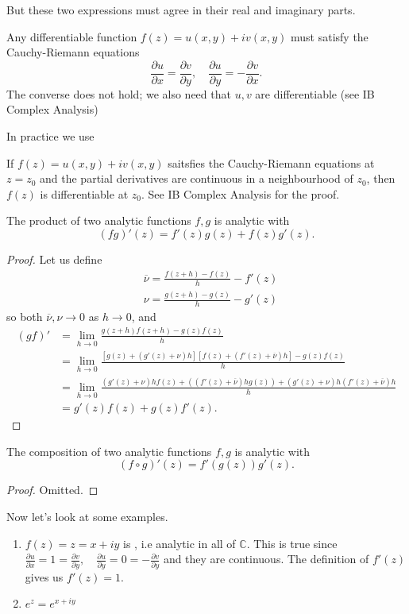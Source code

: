 \documentclass[a4paper]{scrartcl}
\begin{document}
But these two expressions must agree in their real and imaginary parts.
\begin{proposition}
      Any differentiable function $f (z)=u (x,y)+iv (x,y)$ must satisfy the Cauchy-Riemann equations \[
      \frac{\partial u}{\partial x}=\frac{\partial v}{\partial y}, \quad \frac{\partial u}{\partial y}= - \frac{\partial v}{\partial x}
      .\] The converse does not hold; we also need that $u,v$ are differentiable (see IB Complex Analysis)
\end{proposition}
In practice we use 
\begin{proposition}
      If $f (z)=u (x,y)+iv (x,y)$ saitsfies the Cauchy-Riemann equations at $z=z_0 $ and the partial derivatives are continuous in a neighbourhood of $z_0 $, then $f (z)$ is differentiable at $z_0 $. See IB Complex Analysis for the proof. 
\end{proposition}
\begin{proposition}
      The product of two analytic functions $f,g$ is analytic with \[
      (fg)' (z)=f' (z)g (z)+ f (z)g' (z)
      .\]
\end{proposition}
\begin{proof}
      Let us define 
      \begin{align*}
           &\overline{\nu} = \frac{f (z+h)-f (z)}{h}-f' (z)\\
           &\nu= \frac{g (z+h)-g (z)}{h}-g' (z)
      \end{align*}
      so both $\overline{\nu} ,\nu \rightarrow 0$ as $h \rightarrow 0$, and 
      \begin{align*}
           (gf)'&= \lim_{h \rightarrow 0} \frac{g (z+h)f (z+h)-g (z)f (z)}{h}\\
           &= \lim_{h \rightarrow 0} \frac{[g (z)+ (g' (z)+\nu)h][f (z)+(f' (z)+\overline{\nu} )h]-g (z)f (z)}{h}\\
           &= \lim_{h \rightarrow 0} \frac{(g' (z)+\nu)h f (z)+((f' (z)+\overline{\nu} )h g (z))+(g'(z)+\nu)h (f' (z)+\overline{\nu} )h     }{h}\\
           &=g' (z)f (z)+ g (z)f' (z).
      \end{align*}
\end{proof}
\begin{proposition}
      The composition of two analytic functions $f,g$ is analytic with \[
      (f \circ g)' (z)= f' (g (z)) g' (z)
      .\] 
\end{proposition}
\begin{proof}
      Omitted.
\end{proof}
\begin{example}
     Now let's look at some examples. 
      \begin{enumerate}
           \item $f (z)=z=x+iy$ is , i.e analytic in all of $\mathbb{C}$. This is true since $\frac{\partial u}{\partial x}=1= \frac{\partial v}{\partial y}, \quad \frac{\partial u}{\partial y}=0 =- \frac{\partial v}{\partial y}$ and they are continuous. The definition of $f' (z)$ gives us $f' (z)=1$.
           \item $e^{z}=e^{x+iy}$ 
      \end{enumerate}
\end{example}
\end{document}
